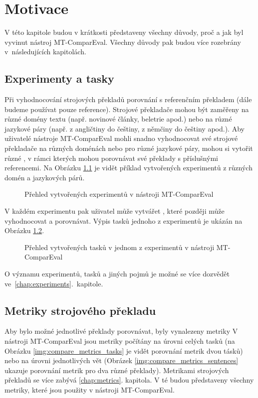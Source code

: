 \chapter{Motivace}
V této kapitole budou v krátkosti představeny všechny důvody,
  proč a jak byl vyvinut nástroj MT-ComparEval.
Všechny důvody pak budou více rozebrány v~následujících kapitolách.

\section{Experimenty a tasky}
Při vyhodnocování strojových překladů porovnání s referenčním překladem
  (dále budeme používat pouze reference).
Strojové překladače mohou být zaměřeny na různé domény textu (např. novinové články, beletrie apod.) 
  nebo na různé jazykové páry (např. z angličtiny do češtiny, z němčiny do češtiny apod.).
Aby uživatelé nástroje MT-ComparEval mohli snadno vyhodnocovat své strojové překladače na různých doménách nebo pro různé jazykové páry,
  mohou si vytořit různé ,
  v rámci kterých mohou porovnávat své překlady s příslušnými referencemi.
Na Obrázku \ref{img:experiments} je vidět příklad vytvořených experimentů z různých domén a jazykových párů.
\begin{figure}
	\caption{Přehled vytvořených experimentů v nástroji MT-ComparEval}
	\label{img:experiments}
\end{figure}

V každém experimentu pak uživatel může vytvářet ,
  které později může vyhodnocovat a porovnávat.
Výpis tasků jednoho z experimentů je ukázán na Obrázku \ref{img:tasks}.
\begin{figure}
	\caption{Přehled vytvořených tasků v jednom z experimentů v nástroji MT-ComparEval}
	\label{img:tasks}
\end{figure}

O významu experimentů, tasků a jiných pojmů je možné se více dozvědět ve~\ref{chap:experiments}.~kapitole.


\section{Metriky strojového překladu}
Aby bylo možné jednotlivé překlady porovnávat,
  byly vynalezeny metriky 
V nástroji MT-ComparEval jsou metriky počítány na úrovni celých tasků 
  (na Obrázku \ref{img:compare_metrics_tasks} je vidět porovnání metrik dvou tásků)
  nebo na úrovni jednotlivých vět
  (Obrázek \ref{img:compare_metrics_sentences} ukazuje porovnání metrik pro dva různé překlady).
Metrikami strojových překladů se více zabývá \ref{chap:metrics}. kapitola.
V té budou představeny všechny metriky,
  které jsou použity v nástroji MT-ComparEval.

